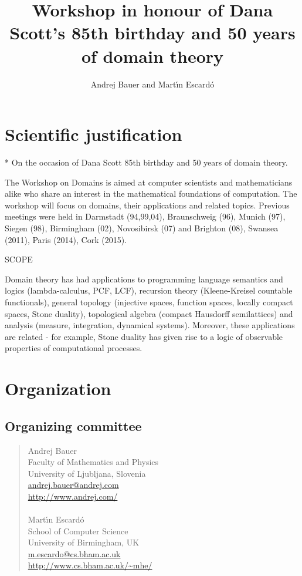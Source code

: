 \documentclass{article}
\title{Workshop in honour of Dana Scott's 85th birthday and 50 years of domain theory}
\author{Andrej Bauer and Mart\'{\i}n Escard\'o}
\date{}
\begin{document}
\maketitle

\section{Scientific justification}

* On the occasion of Dana Scott 85th birthday and 50 years of
domain theory.

The Workshop on Domains is aimed at computer scientists and
mathematicians alike who share an interest in the mathematical
foundations of computation. The workshop will focus on domains,
their applications and related topics.  Previous meetings were
held in Darmstadt (94,99,04), Braunschweig (96), Munich (97),
Siegen (98), Birmingham (02), Novosibirsk (07) and Brighton (08),
Swansea (2011), Paris (2014), Cork (2015).

SCOPE

    Domain theory has had applications to programming language
semantics and logics (lambda-calculus, PCF, LCF), recursion theory
(Kleene-Kreisel countable functionals), general topology (injective
spaces, function spaces, locally compact spaces, Stone duality),
topological algebra (compact Hausdorff semilattices) and analysis
(measure, integration, dynamical systems). Moreover, these
applications are related - for example, Stone duality has given
rise to a logic of observable properties of computational
processes.

\section{Organization}

\subsection{Organizing committee}

\begin{quote}
Andrej Bauer \\
Faculty of Mathematics and Physics \\
University of Ljubljana, Slovenia \\
\url{andrej.bauer@andrej.com} \\
\url{http://www.andrej.com/} \\
~ \\
Mart\'{\i}n Escard\'o \\
School of Computer Science \\
University of Birmingham, UK \\
\url{m.escardo@cs.bham.ac.uk} \\
\url{http://www.cs.bham.ac.uk/~mhe/}
\end{quote}
\end{document}
